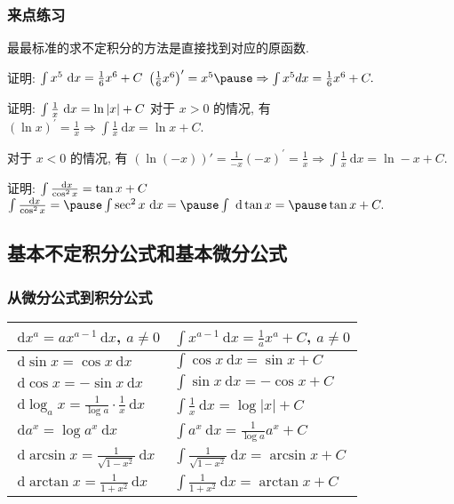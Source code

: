 \documentclass[
10pt,
aspectratio=43,
]{beamer}
\begin{document}
\begin{frame}
	\frametitle{来点练习}
	\everymath{\displaystyle}
	最最标准的求不定积分的方法是直接找到对应的原函数.
	{\small
	\pause
	\begin{exampleblock}{证明: $\color{black}\int x^5 \mathrm{~d} x=\frac{1}{6} x^6+C$}
		\pause
		$
			\left(\frac{1}{6} x^6\right)^{\prime}=x^5 \pause \Rightarrow \int x^5 d x=\frac{1}{6} x^6+C.
		$
	\end{exampleblock}
	\pause
	\begin{exampleblock}{证明: $\color{black}\int \frac1x \mathrm{~d} x=\ln |x|+C$}
		\pause
		对于 $x>0$ 的情况, 有
		$
			(\ln x)^{\prime}=\frac{1}{x} \Rightarrow \int \frac{1}{x} \mathrm{~d} x=\ln x+C.
		$
		\pause

		对于 $x<0$ 的情况, 有
		$
			(\ln (-x))'=\frac{1}{-x}(-x)^{\prime}=\frac{1}{x} \Rightarrow \int \frac{1}{x} \mathrm{~d} x=\ln -x+C.
		$
	\end{exampleblock}
	\pause
	\begin{exampleblock}{证明: $\color{black}\int \frac{\mathrm{~d} x}{\cos ^2 x}=\tan x+C$}
		\pause
		$
			\int \frac{\mathrm{~d} x}{\cos ^2 x}=\pause\int \sec ^2 x \mathrm{~d} x=\pause\int \mathrm{~d} \tan x=\pause\tan x+ C.
		$
	\end{exampleblock}
	}
\end{frame}

\subsection{基本不定积分公式和基本微分公式}
\begin{frame}
	\frametitle{从微分公式到积分公式}
	\everymath{\displaystyle}
	\renewcommand{\arraystretch}{2.3}
	\resizebox{\linewidth}{!}
	{
		\begin{tabular}{|p{}|p{}|}
			\hline
			$\mathrm{~d}x^a=ax^{a-1}\mathrm{~d}x$, $a\neq0$                   & $\int x^{a-1}\mathrm{~d}x=\frac{1}{a}x^{a}+C$, $a\neq0$  \\
			\hline
			$\mathrm{~d}\sin x=\cos x\mathrm{~d}x$                            & $\int \cos x\mathrm{~d}x = \sin x+C$                     \\
			\hline
			$\mathrm{~d}\cos x=-\sin x\mathrm{~d}x$                           & $\int \sin x\mathrm{~d}x=-\cos x +C$                     \\
			\hline
			$\mathrm{~d}\log_ax=\frac{1}{\log a}\cdot\frac{1}{x}\mathrm{~d}x$ & $\int \frac{1}{x}\mathrm{~d}x = \log |x|+C$              \\
			\hline
			$\mathrm{~d}a^x=\log a^x\mathrm{~d}x$                             & $\int a^x\mathrm{~d}x = \frac{1}{\log a}a^x+C$           \\
			\hline
			$\mathrm{~d}\arcsin x =\frac{1}{\sqrt{1-x^2}}\mathrm{~d}x$        & $\int \frac{1}{\sqrt{1-x^2}}\mathrm{~d}x = \arcsin x +C$ \\
			\hline
			$\mathrm{~d}\arctan x =\frac{1}{1+x^2}\mathrm{~d}x$               & $\int \frac{1}{1+x^2}\mathrm{~d}x = \arctan x +C$        \\
			\hline
		\end{tabular}
	}
\end{frame}
\end{document}
